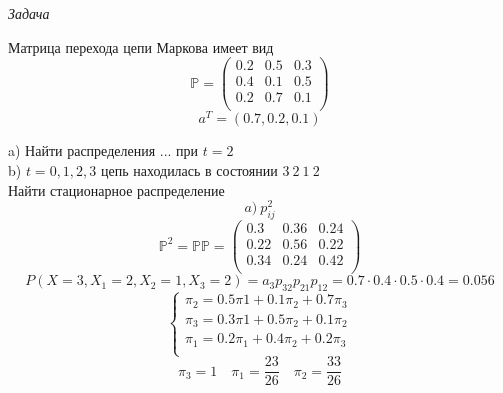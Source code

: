 \documentclass[a4paper]{article}
\begin{document}
\emph{Задача}

Матрица перехода цепи Маркова имеет вид
\[
    \mathbb{P} = \begin{pmatrix}
    0.2 & 0.5 & 0.3\\
    0.4 & 0.1 & 0.5\\
    0.2 & 0.7 & 0.1\\
    
    \end{pmatrix}
\]
\[
    a^{T} = (0.7, 0.2, 0.1)
\]

a) Найти распределения ... при $ t = 2 $\\
b) $ t = 0, 1, 2, 3 $ цепь находилась в состоянии $ 3 \ 2 \ 1 \ 2 $ \\
Найти стационарное распределение
\[
    a) \ p_{ij}^{2}
\]
\[
    \mathbb{P}^2 = \mathbb{P}\mathbb{P} = \begin{pmatrix}
    0.3 & 0.36 & 0.24\\
    0.22 & 0.56 & 0.22\\
    0.34 & 0.24 & 0.42\\
    
    \end{pmatrix}
\]
\[
    P(X = 3, X_1 = 2, X_2 = 1, X_3 = 2) = a_3 p_{32} p_{21} p_{12} = 
    0.7 \cdot 0.4 \cdot 0.5 \cdot 0.4 = 0.056
\]
\[
    \begin{cases}
        \pi_2 = 0.5 \pi 1 + 0.1 \pi_2 + 0.7 \pi_3\\
        \pi_3 = 0.3 \pi 1 + 0.5 \pi_2 + 0.1 \pi_2\\
        \pi_1 = 0.2 \pi_1 + 0.4 \pi_2 + 0.2 \pi_3\\
    \end{cases}
\]
\[
    \pi_3 = 1 \quad \pi_1 = \frac{23}{26} \quad \pi_2 = \frac{33}{26} 
\]
\end{document}
